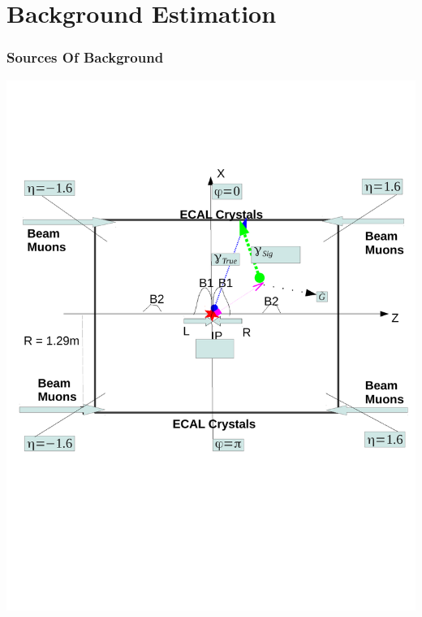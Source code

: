\documentclass{beamer}
\begin{document}
\section{Background Estimation}
\begin{frame}
\frametitle{Sources Of Background}
  \begin{minipage}[t]{0.8\linewidth}
   \includegraphics[width=\textwidth]{THESISPLOTS/Background_Delayed_Photon.pdf}
  \end{minipage}
\end{frame}
\end{document}
